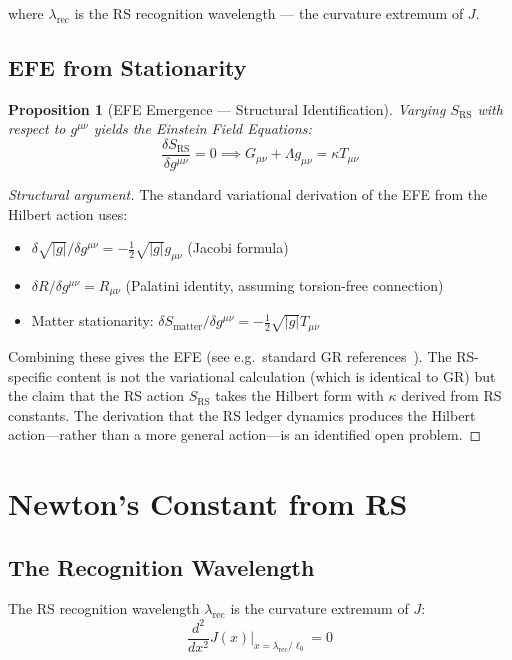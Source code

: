 \documentclass[12pt,a4paper]{article}
\newtheorem{proposition}[theorem]{Proposition}
\theoremstyle{definition}
\theoremstyle{remark}
\begin{document}
where $\lambda_\mathrm{rec}$ is the RS recognition wavelength — the curvature extremum of $J$.

\subsection{EFE from Stationarity}

\begin{proposition}[EFE Emergence --- Structural Identification]
Varying $S_\mathrm{RS}$ with respect to $g^{\mu\nu}$ yields the Einstein Field Equations:
\begin{equation}
\frac{\delta S_\mathrm{RS}}{\delta g^{\mu\nu}} = 0 \implies G_{\mu\nu} + \Lambda g_{\mu\nu} = \kappa T_{\mu\nu}
\end{equation}
\end{proposition}

\begin{proof}[Structural argument]
The standard variational derivation of the EFE from the Hilbert action uses:
\begin{itemize}
\item $\delta\sqrt{|g|}/\delta g^{\mu\nu} = -\frac{1}{2}\sqrt{|g|}g_{\mu\nu}$ (Jacobi formula)
\item $\delta R/\delta g^{\mu\nu} = R_{\mu\nu}$ (Palatini identity, assuming torsion-free connection)
\item Matter stationarity: $\delta S_\mathrm{matter}/\delta g^{\mu\nu} = -\frac{1}{2}\sqrt{|g|}T_{\mu\nu}$
\end{itemize}
Combining these gives the EFE (see e.g.\ standard GR references~\cite{wald}).  The
RS-specific content is not the variational calculation (which is identical to GR) but
the claim that the RS action $S_\mathrm{RS}$ takes the Hilbert form with $\kappa$
derived from RS constants.  The derivation that the RS ledger dynamics produces the
Hilbert action---rather than a more general action---is an identified open problem.
\end{proof}

\section{Newton's Constant from RS}
\label{sec:newton}

\subsection{The Recognition Wavelength}

The RS recognition wavelength $\lambda_\mathrm{rec}$ is the curvature extremum of $J$:
\begin{equation}
\frac{d^2}{dx^2}J(x)\bigg|_{x = \lambda_\mathrm{rec}/\ell_0} = 0
\end{equation}
\end{document}
